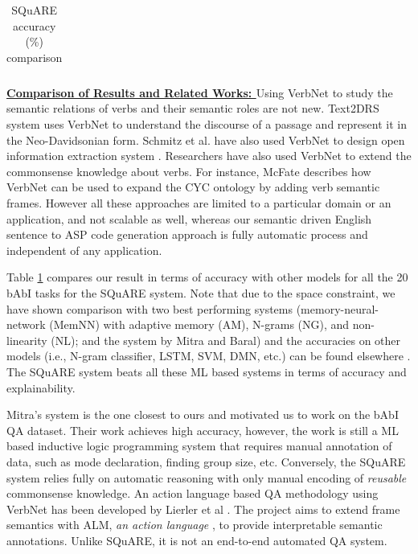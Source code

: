 \documentclass[letterpaper]{article}
\begin{document}
\begin{table}[b]
\begin{tabular}{|c||*{3}{c|}}
\end{tabular}

\caption{SQuARE accuracy (\%)  comparison}
\label{table:square_compare}
\end{table}



\noindent\textbf{\underline{Comparison of Results and Related Works: }}
Using VerbNet to study the semantic relations of verbs and their semantic roles are not new. Text2DRS system \cite{text_to_drs} uses VerbNet to understand the discourse of a passage and represent it in the Neo-Davidsonian form. Schmitz et al. have also used VerbNet to design open information extraction system \cite{vn_ie}. Researchers have also used VerbNet to extend the commonsense knowledge about verbs. For instance, McFate \cite{cyc_vn} describes how VerbNet can be used to expand the CYC ontology by adding verb semantic frames. However all these approaches are limited to a particular domain or an application, and not scalable as well, whereas our semantic driven English sentence to ASP code generation approach is fully automatic process and independent of any application.

Table \ref{table:square_compare} compares our result in terms of accuracy with other models for all the 20 bAbI tasks for the SQuARE system. Note that due to the space constraint, we have shown comparison with two best performing systems (memory-neural-network (MemNN) with adaptive memory (AM), N-grams (NG), and non-linearity (NL); and the system by Mitra and Baral) and the accuracies on other models (i.e., N-gram classifier, LSTM, SVM, DMN, etc.) can be found elsewhere \cite{babi,dmn}. The SQuARE system beats all these ML based systems in terms of accuracy and explainability.

Mitra's system is the one closest to ours and motivated us to work on
the bAbI QA dataset. Their work achieves high accuracy, however, the
work is still a ML based inductive logic programming system that
requires manual annotation of data, such as mode declaration, finding
group size, etc. Conversely, the SQuARE system relies fully on
automatic reasoning with only manual encoding of \textit{reusable}
commonsense knowledge. An action language based QA methodology using
VerbNet has been developed by Lierler et al \cite{ALM}. The project
aims to extend frame semantics with ALM, \textit{an action language}
\cite{ALM}, to provide interpretable semantic annotations. Unlike
SQuARE, it is not an end-to-end automated QA system.
\end{document}
